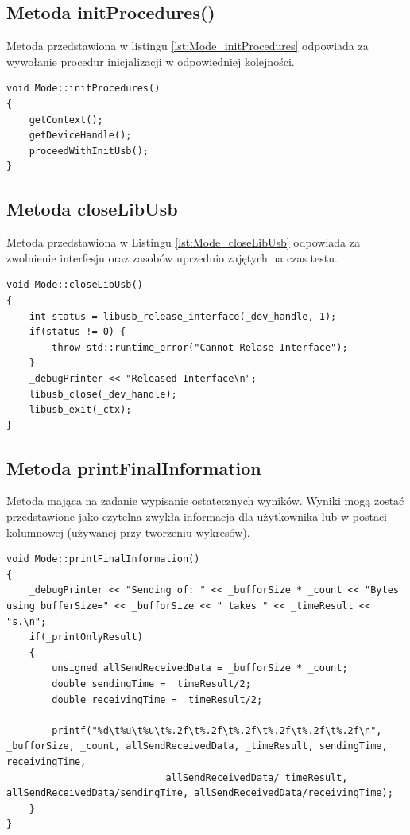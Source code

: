 \documentclass{BscUS}
\begin{document}
\subsection{Metoda initProcedures()}
Metoda przedstawiona w listingu \ref{lst:Mode_initProcedures} odpowiada za wywołanie procedur inicjalizacji w odpowiedniej kolejności.
\begin{lstlisting}[caption={Metoda Mode::initProcedures()},label={lst:Mode_initProcedures}]
void Mode::initProcedures()
{
	getContext(); 
	getDeviceHandle();
	proceedWithInitUsb();
}
\end{lstlisting}
\subsection{Metoda closeLibUsb}
Metoda przedstawiona w Listingu \ref{lst:Mode_closeLibUsb} odpowiada za zwolnienie interfesju oraz zasobów uprzednio zajętych na czas testu.
\begin{lstlisting}[caption={Metoda Mode::closeLibUsb()},label={lst:Mode_closeLibUsb}]
void Mode::closeLibUsb()
{
	int status = libusb_release_interface(_dev_handle, 1); 
	if(status != 0) {
		throw std::runtime_error("Cannot Relase Interface");
	}
	_debugPrinter << "Released Interface\n";
	libusb_close(_dev_handle);
	libusb_exit(_ctx); 
}
\end{lstlisting}


\subsection{Metoda printFinalInformation}
Metoda mająca na zadanie wypisanie ostatecznych wyników. Wyniki mogą zostać przedstawione jako czytelna zwykła informacja dla użytkownika lub w postaci kolumnowej (używanej przy tworzeniu wykresów).
\begin{lstlisting}[caption={Metoda Mode::printFinalInformation()},label={lst:Mode_printFinalInformation}]
void Mode::printFinalInformation()
{
	_debugPrinter << "Sending of: " << _bufforSize * _count << "Bytes using bufferSize=" << _bufforSize << " takes " << _timeResult << "s.\n";
	if(_printOnlyResult)
	{
		unsigned allSendReceivedData = _bufforSize * _count;
		double sendingTime = _timeResult/2;
		double receivingTime = _timeResult/2;

		printf("%d\t%u\t%u\t%.2f\t%.2f\t%.2f\t%.2f\t%.2f\t%.2f\n", _bufforSize, _count, allSendReceivedData, _timeResult, sendingTime, receivingTime,
							allSendReceivedData/_timeResult, allSendReceivedData/sendingTime, allSendReceivedData/receivingTime);
	}
}
\end{lstlisting}
\iffalse
%
%
\end{document}
